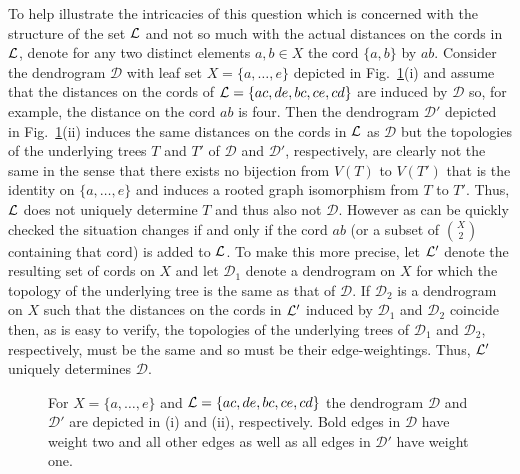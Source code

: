 To help illustrate the intricacies of this question which is concerned
with the structure of the set ${\mathcal L}$ and not so much with 
the actual distances on the cords in ${\mathcal L}$,
denote for any two distinct elements $a,b\in X$ the cord $\{a,b\}$
by $ab$. Consider the dendrogram $\mathcal D$ with leaf set
$X=\{a,\ldots, e\}$ depicted in
Fig.~\ref{fig:lasso-example}(i) and assume
 that the distances on the cords of ${\mathcal L}=\{ac,de,bc,ce,cd\}$
are induced by $\mathcal D$ so, for example, the distance 
on the cord $ab$ 
is four. Then the dendrogram $\mathcal D'$
depicted in Fig.~\ref{fig:lasso-example}(ii) induces the
same distances on the cords in ${\mathcal L}$ as $\mathcal D$
but the topologies of the underlying trees $T$ and $T'$
of $\mathcal D$ and $\mathcal D'$, respectively, 
are clearly not the same in the sense that there exists no
bijection from $V(T)$ to $V(T')$ that is the
identity on $\{a,\ldots, e\}$ and induces a  rooted graph 
isomorphism from  $T$ to $T'$.
Thus, ${\mathcal L}$ does
not uniquely determine $T$ and thus also not $\mathcal D$. However
as can be quickly checked the situation changes if and only if
the cord $ab$ (or a subset of ${X\choose 2}$ containing that cord)
is added to ${\mathcal L}$.  To make this more precise, 
let ${\mathcal L}'$ denote the resulting set of cords on $X$
and let $\mathcal D_1$ denote a dendrogram on $X$ for which the
topology of the underlying tree 
is the same as that of $\mathcal D$. If $\mathcal D_2$ is a dendrogram
on $X$  such that the distances on the
cords in ${\mathcal L}'$ induced by $\mathcal D_1$ and $\mathcal D_2$ coincide then,
as is easy to verify, the topologies of the 
underlying trees of $\mathcal D_1$ and $\mathcal D_2$,  
respectively, must be the same 
and so must be their edge-weightings. Thus, ${\mathcal L}'$
uniquely determines $\mathcal D$. 

\begin{figure}[h]
\begin{center}

\end{center}
\caption{\label{fig:lasso-example}
For $X=\{a,\ldots, e\}$ and ${\mathcal L}=\{ac,de,bc,ce,cd\}$
the dendrogram $\mathcal D$  and $\mathcal D'$ are depicted in 
(i) and (ii), respectively. 
Bold edges
in $\mathcal D$ have weight two and all other edges as well 
as all edges in $\mathcal D'$
have weight one.
}
\end{figure}
%

